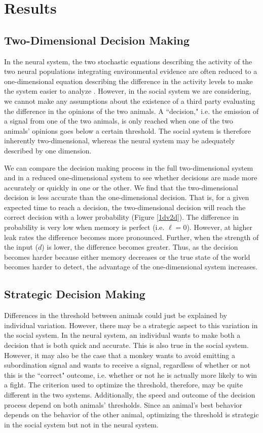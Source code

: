 \documentclass{article}
\begin{document}
\section{Results}

\subsection{Two-Dimensional Decision Making }
In the neural system, the two stochastic equations describing the activity of the two neural populations integrating environmental evidence are often reduced to a one-dimensional equation describing the difference in the activity levels to make the system easier to analyze \cite{Brown:2005fk,Bogacz:2006uq,Feng:2009kl}.  However, in the social system we are considering, we cannot make any assumptions about the existence of a third party evaluating the difference in the opinions of the two animals.  A ``decision," i.e. the emission of a signal from one of the two animals, is only reached when one of the two animals' opinions goes below a certain threshold.  The social system is therefore inherently two-dimensional, whereas the neural system may be adequately described by one dimension. 

We can compare the decision making process in the full two-dimensional system and in a reduced one-dimensional system to see whether decisions are made more accurately or quickly in one or the other. We find that the two-dimensional decision is less accurate than the one-dimensional decision.  That is, for a given expected time to reach a decision, the two-dimensional decision will reach the correct decision with a lower probability (Figure \ref{1dv2d}).  The difference in probability is very low when memory is perfect (i.e. $\ell=0$).  However, at higher leak rates the difference becomes more pronounced.  Further, when the strength of the input ($d$) is lower, the difference becomes greater.  Thus, as the decision becomes harder because either memory decreases or the true state of the world becomes harder to detect, the advantage of the one-dimensional system increases.

\subsection{Strategic Decision Making }
Differences in the threshold between animals could just be explained by individual variation.  However, there may be a strategic aspect to this variation in the social system.  In the neural system, an individual wants to make both a decision that is both quick and accurate.  This is also true in the social system.  However, it may also be the case that a monkey wants to avoid emitting a subordination signal and wants to receive a signal, regardless of whether or not this is the ``correct" outcome, i.e. whether or not he is actually more likely to win a fight.  The criterion used to optimize the threshold, therefore, may be quite different in the two systems.  Additionally, the speed and outcome of the decision process depend on both animals' thresholds.  Since an animal's best behavior depends on the behavior of the other animal, optimizing the threshold is strategic in the social system but not in the neural system.  
\end{document}
